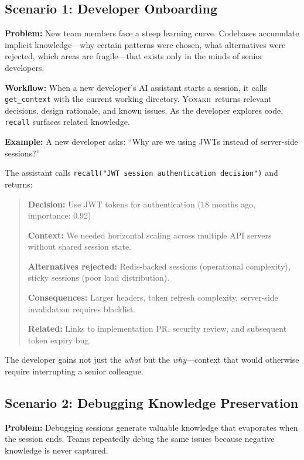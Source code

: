 \documentclass[10pt,journal,compsoc]{IEEEtran}
\newcommand{\yonakh}{\textsc{Yonakh}}
\begin{document}
\subsection{Scenario 1: Developer Onboarding}

\textbf{Problem:} New team members face a steep learning curve. Codebases accumulate implicit knowledge---why certain patterns were chosen, what alternatives were rejected, which areas are fragile---that exists only in the minds of senior developers.

\textbf{Workflow:} When a new developer's AI assistant starts a session, it calls \texttt{get\_context} with the current working directory. \yonakh\ returns relevant decisions, design rationale, and known issues. As the developer explores code, \texttt{recall} surfaces related knowledge.

\textbf{Example:} A new developer asks: ``Why are we using JWTs instead of server-side sessions?''

The assistant calls \texttt{recall("JWT session authentication decision")} and returns:

\begin{quote}
\textbf{Decision:} Use JWT tokens for authentication (18 months ago, importance: 0.92)

\textbf{Context:} We needed horizontal scaling across multiple API servers without shared session state.

\textbf{Alternatives rejected:} Redis-backed sessions (operational complexity), sticky sessions (poor load distribution).

\textbf{Consequences:} Larger headers, token refresh complexity, server-side invalidation requires blacklist.

\textbf{Related:} Links to implementation PR, security review, and subsequent token expiry bug.
\end{quote}

The developer gains not just the \emph{what} but the \emph{why}---context that would otherwise require interrupting a senior colleague.

\subsection{Scenario 2: Debugging Knowledge Preservation}

\textbf{Problem:} Debugging sessions generate valuable knowledge that evaporates when the session ends. Teams repeatedly debug the same issues because negative knowledge is never captured.
\end{document}
